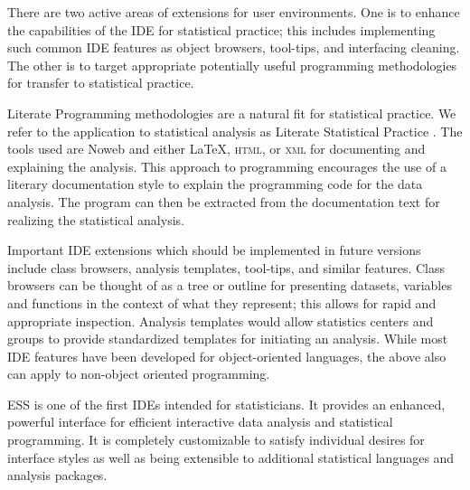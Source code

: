 \documentclass{article}
\begin{document}
There are two active areas of extensions for user environments.  One
is to enhance the capabilities of the IDE for statistical practice;
this includes implementing such common IDE features as object
browsers, tool-tips, and interfacing cleaning.  The other is to target
appropriate potentially useful programming methodologies for transfer
to statistical practice.

Literate Programming methodologies \citep{Knuth:1992,NRamsey:1994} are
a natural fit for statistical practice.  We refer to the application
to statistical analysis as Literate Statistical Practice
\citep{rossini:dsc:2001}.  The tools used are Noweb
\citep{NRamsey:1994} and either \LaTeX, \textsc{html}, or \textsc{xml}
for documenting and explaining the analysis.  This approach to
programming encourages the use of a literary documentation style to
explain the programming code for the data analysis.  The program can
then be extracted from the documentation text for realizing the
statistical analysis.

Important IDE extensions which should be implemented in future
versions include class browsers, analysis templates, tool-tips, and
similar features.  Class browsers can be thought of as a tree or
outline for presenting datasets, variables and functions in the
context of what they represent; this allows for rapid and appropriate
inspection.  Analysis templates would allow statistics centers and
groups to provide standardized templates for initiating an analysis.
While most IDE features have been developed for object-oriented
languages, the above also can apply to non-object oriented
programming.

ESS is one of the first IDEs intended for statisticians.  It provides
an enhanced, powerful interface for efficient interactive data
analysis and statistical programming.  It is completely customizable
to satisfy individual desires for interface styles as well as being
extensible to additional statistical languages and analysis packages.




\end{document}
